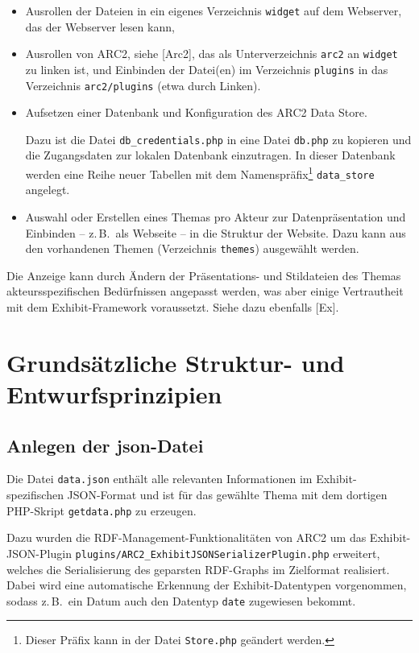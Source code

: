 \documentclass[11pt,a4paper]{article}
\begin{document}
\begin{itemize}
\item Ausrollen der Dateien in ein eigenes Verzeichnis \texttt{widget} auf dem
  Webserver, das der Webserver lesen kann,
\item Ausrollen von ARC2, siehe [Arc2], das als Unterverzeichnis \texttt{arc2}
  an \texttt{widget} zu linken ist, und Einbinden der Datei(en) im Verzeichnis
  \texttt{plugins} in das Verzeichnis \texttt{arc2/plugins} (etwa durch
  Linken).
\item Aufsetzen einer Datenbank und Konfiguration des ARC2 Data Store. 

  Dazu ist die Datei \texttt{db\_credentials.php} in eine Datei
  \texttt{db.php} zu kopieren und die Zugangsdaten zur lokalen Datenbank
  einzutragen. In dieser Datenbank werden eine Reihe neuer Tabellen mit dem
  Namenspräfix\footnote{Dieser Präfix kann in der Datei \texttt{Store.php}
    geändert werden.} \texttt{data\_store} angelegt.
\item Auswahl oder Erstellen eines Themas pro Akteur zur Datenpräsentation und
  Einbinden -- z.\,B.\ als Webseite -- in die Struktur der Website.  Dazu kann
  aus den vorhandenen Themen (Verzeichnis \texttt{themes}) ausgewählt werden. 
\end{itemize}
Die Anzeige kann durch Ändern der Präsentations- und Stildateien des Themas
akteurs\-spezifischen Bedürfnissen angepasst werden, was aber einige
Vertrautheit mit dem Exhibit-Framework voraussetzt.  Siehe dazu ebenfalls
[Ex].

\section{Grundsätzliche Struktur- und Entwurfsprinzipien}

\subsection{Anlegen der json-Datei}

Die Datei \texttt{data.json} enthält alle relevanten Informationen im
Exhibit-spezifischen JSON-Format und ist für das gewählte Thema mit dem
dortigen PHP-Skript \texttt{getdata.php} zu erzeugen.

Dazu wurden die RDF-Management-Funktionalitäten von ARC2 um das
Exhibit-JSON-Plug\-in \texttt{plugins/ARC2\_ExhibitJSONSerializerPlugin.php}
erweitert, welches die Serialisierung des geparsten RDF-Graphs im Zielformat
realisiert.  Dabei wird eine automatische Erkennung der Exhibit-Datentypen
vorgenommen, sodass z.\,B.\ ein Datum auch den Datentyp \texttt{date}
zugewiesen bekommt.
\end{document}

